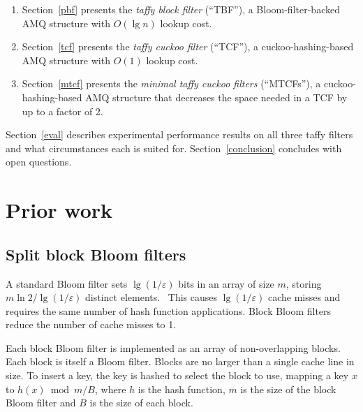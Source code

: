 \documentclass[sigconf, nonacm]{acmart}
\newcommand{\etal}{et al.}
\begin{document}
\begin{enumerate}
\item Section~\ref{pbf}  presents the {\em taffy block filter}           (``TBF''),   a Bloom-filter-backed  AMQ structure with $O(\lg n)$ lookup cost.
\item Section~\ref{tcf}  presents the {\em taffy cuckoo filter}          (``TCF''),   a cuckoo-hashing-based AMQ structure with $O(1)$ lookup cost.
\item Section~\ref{mtcf} presents the {\em minimal taffy cuckoo filters} (``MTCFs''), a cuckoo-hashing-based AMQ structure that decreases the space needed in a TCF by up to a factor of 2.
\end{enumerate}

Section~\ref{eval} describes experimental performance results on all three taffy filters and what circumstances each is suited for. %
Section~\ref{conclusion} concludes with open questions.


\section{Prior work}

\subsection{Split block Bloom filters}



A standard Bloom filter sets $\lg (1/\varepsilon)$ bits in an array of size $m$, storing $m \ln 2 / \lg(1/\varepsilon)$ distinct elements.~\cite{bloom-original}
This causes $\lg (1/\varepsilon)$ cache misses and requires the same number of hash function applications.
Block Bloom filters reduce the number of cache misses to 1.~\cite{block-bloom}

Each block Bloom filter is implemented as an array of non-overlapping blocks.
Each block is itself a Bloom filter.
Blocks are no larger than a single cache line in size.
To insert a key, the key is hashed to select the block to use, mapping a key $x$ to $h(x) \bmod m/B$, where $h$ is the hash function, $m$ is the size of the block Bloom filter and $B$ is the size of each block.
\end{document}
